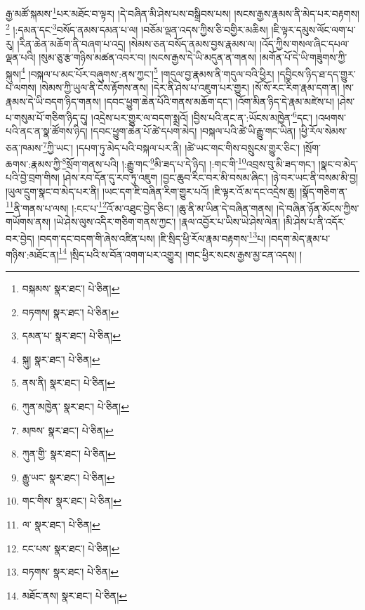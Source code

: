 རྒྱ་མཚོ་སྐམས་\footnote{བསྐམས་  སྣར་ཐང་།  པེ་ཅིན། }པར་མཐོང་བ་ལྟར། །དེ་བཞིན་མི་ཤེས་པས་བསྒྲིབས་པས། །སངས་རྒྱས་རྣམས་ནི་མེད་པར་བརྟགས།\footnote{བཏགས།  སྣར་ཐང་།  པེ་ཅིན། } །:དམན་དང་\footnote{དམན་པ་  སྣར་ཐང་།  པེ་ཅིན། }བསོད་ནམས་དམན་པ་ལ། །བཅོམ་ལྡན་འདས་ཀྱིས་ཅི་བགྱིར་མཆིས། །ཇི་ལྟར་དམུས་ལོང་ལག་པ་རུ། །རིན་ཆེན་མཆོག་ནི་བཞག་པ་འདྲ། །སེམས་ཅན་བསོད་ནམས་བྱས་རྣམས་ལ། །འོད་ཀྱིས་གསལ་ཞིང་དཔལ་ལྡན་པའི། །སུམ་ཅུ་རྩ་གཉིས་མཚན་འབར་བ། །སངས་རྒྱས་དེ་ཡི་མདུན་ན་གནས། །མགོན་པོ་དེ་ཡི་གཟུགས་ཀྱི་སྐུས།\footnote{སྐུ།  སྣར་ཐང་།  པེ་ཅིན། } །བསྐལ་པ་མང་པོར་བཞུགས་:ནས་ཀྱང་།\footnote{ནས་ནི།  སྣར་ཐང་།  པེ་ཅིན། } །གདུལ་བྱ་རྣམས་ནི་གདུལ་བའི་ཕྱིར། །དབྱིངས་ཉིད་ཐ་དད་གྱུར་པ་ལགས། །སེམས་ཀྱི་ཡུལ་ནི་ངེས་རྟོགས་ནས། །དེར་ནི་ཤེས་པ་འཇུག་པར་གྱུར། །སོ་སོ་རང་རིག་རྣམ་དག་ན། །ས་རྣམས་དེ་ཡི་བདག་ཉིད་གནས། །དབང་ཕྱུག་ཆེན་པོའི་གནས་མཆོག་དང་། །འོག་མིན་ཉིད་དེ་རྣམ་མཛེས་པ། །ཤེས་པ་གསུམ་པོ་གཅིག་ཉིད་དུ། །འདྲེས་པར་གྱུར་ལ་བདག་སྨྲའོ། །བྱིས་པའི་ནང་ན་:ཡོངས་མཁྱེན་\footnote{ཀུན་མཁྱེན་  སྣར་ཐང་།  པེ་ཅིན། }དང་། །འཕགས་པའི་ནང་ན་སྣ་ཚོགས་ཉིད། །དབང་ཕྱུག་ཆེན་པོ་ཚེ་དཔག་མེད། །བསྐལ་པའི་ཚེ་ཡི་རྒྱུ་གང་ཡིན། །ཕྱི་རོལ་སེམས་ཅན་ཁམས་\footnote{མཁས་  སྣར་ཐང་།  པེ་ཅིན། }ཀྱི་ཡང་། །དཔག་ཏུ་མེད་པའི་བསྐལ་པར་ནི། །ཚེ་ཡང་གང་གིས་བསྲུངས་གྱུར་ཅིང་། །སྲོག་ཆགས་:རྣམས་ཀྱི་\footnote{ཀུན་གྱི་  སྣར་ཐང་།  པེ་ཅིན། }སྲོག་གནས་པའི། །:རྒྱུ་གང་\footnote{རྒྱུ་ཡང་  སྣར་ཐང་།  པེ་ཅིན། }མི་ཟད་པ་དེ་ཉིད། །:གང་གི་\footnote{གང་གིས་  སྣར་ཐང་།  པེ་ཅིན། }འབྲས་བུ་མི་ཟད་གང་། །སྣང་བ་མེད་པའི་བྱེ་བྲག་གིས། །ཤེས་རབ་དོན་དུ་རབ་ཏུ་འཇུག །བྱང་ཆུབ་རིང་བར་མི་བསམ་ཞིང་། །ཉེ་བར་ཡང་ནི་བསམ་མི་བྱ། །ཡུལ་དྲུག་སྣང་བ་མེད་པར་ནི། །ཡང་དག་ཇི་བཞིན་རིག་གྱུར་པའོ། །ཇི་ལྟར་འོ་མ་དང་འདྲེས་ཆུ། །སྣོད་གཅིག་ན་\footnote{ལ་  སྣར་ཐང་།  པེ་ཅིན། }ནི་གནས་པ་ལས། །:ངང་པ་\footnote{ངང་པས་  སྣར་ཐང་།  པེ་ཅིན། }འོ་མ་འཐུང་བྱེད་ཅིང་། །ཆུ་ནི་མ་ཡིན་དེ་བཞིན་གནས། །དེ་བཞིན་ཉོན་མོངས་ཀྱིས་གཡོགས་ནས། །ཡེ་ཤེས་ལུས་འདིར་གཅིག་གནས་ཀྱང་། །རྣལ་འབྱོར་པ་ཡིས་ཡེ་ཤེས་ལེན། །མི་ཤེས་པ་ནི་འདོར་བར་བྱེད། །བདག་དང་བདག་གི་ཞེས་འཛིན་པས། །ཇི་སྲིད་ཕྱི་རོལ་རྣམ་བརྟགས་\footnote{བཏགས་  སྣར་ཐང་།  པེ་ཅིན། }པ། །བདག་མེད་རྣམ་པ་གཉིས་:མཐོང་ན།\footnote{མཐོང་ནས།  སྣར་ཐང་།  པེ་ཅིན། } །སྲིད་པའི་ས་བོན་འགག་པར་འགྱུར། །གང་ཕྱིར་སངས་རྒྱས་མྱ་ངན་འདས། །
